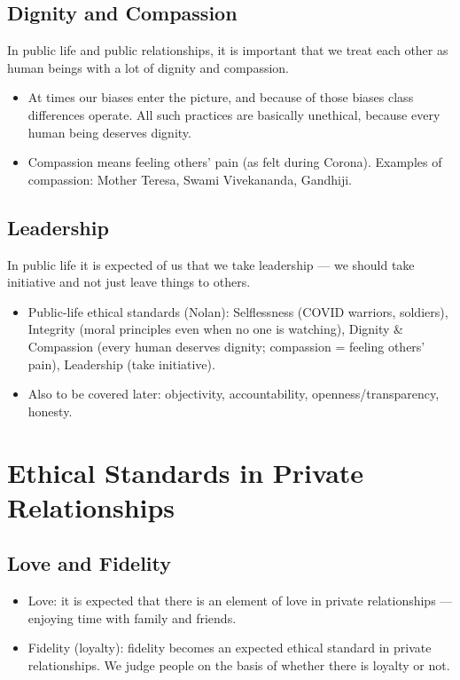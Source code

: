 \subsection{Dignity and Compassion}

In public life and public relationships, it is important that we treat each other as human beings with a lot of dignity and compassion.

\begin{itemize}
\item At times our biases enter the picture, and because of those biases class differences operate. All such practices are basically unethical, because every human being deserves dignity.
\item Compassion means feeling others' pain (as felt during Corona). Examples of compassion: Mother Teresa, Swami Vivekananda, Gandhiji.
\end{itemize}

\subsection{Leadership}

In public life it is expected of us that we take leadership --- we should take initiative and not just leave things to others.

\begin{QuickRevision}
\begin{itemize}
\item Public-life ethical standards (Nolan): Selflessness (COVID warriors, soldiers), Integrity (moral principles even when no one is watching), Dignity \& Compassion (every human deserves dignity; compassion = feeling others' pain), Leadership (take initiative).
\item Also to be covered later: objectivity, accountability, openness/transparency, honesty.
\end{itemize}
\end{QuickRevision}

\section{Ethical Standards in Private Relationships}

\subsection{Love and Fidelity}

\begin{itemize}
\item Love: it is expected that there is an element of love in private relationships --- enjoying time with family and friends.
\item Fidelity (loyalty): fidelity becomes an expected ethical standard in private relationships. We judge people on the basis of whether there is loyalty or not.
\end{itemize}

